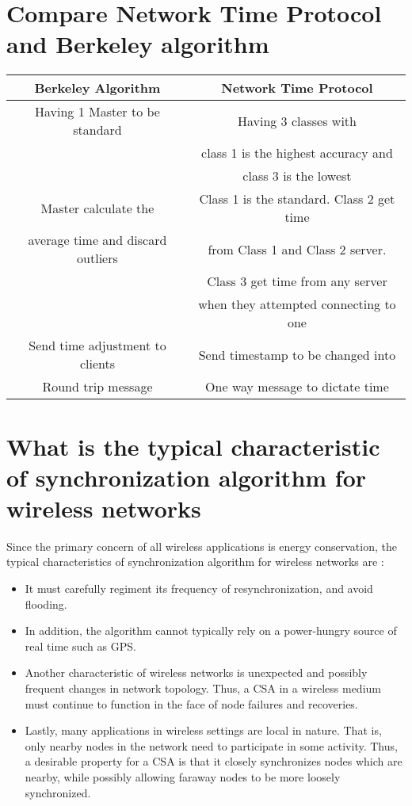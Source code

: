 \documentclass[11pt,a4paper]{article}
\begin{document}
\section{Compare Network Time Protocol and Berkeley algorithm}
\begin{tabular}{|c|c|}
\hline 
Berkeley Algorithm & Network Time Protocol \\ 
\hline 
Having 1 Master to be standard & Having 3 classes with \\ & class 1 is the highest accuracy and\\ & class 3 is the lowest \\ 
\hline 
Master calculate the & Class 1 is the standard. Class 2 get time \\ average time and discard outliers & from Class 1 and Class 2 server. \\ & Class 3 get time from any server \\ & when they attempted connecting to one \\ 
\hline 
Send time adjustment to clients  & Send timestamp to be changed into \\ 
\hline 
Round trip message & One way message to dictate time \\ 
\hline 
\end{tabular}

\section{What is the typical characteristic of synchronization algorithm for wireless networks}
Since the primary concern of all wireless applications is energy conservation, the typical characteristics of synchronization algorithm for wireless networks are :
\begin{itemize}
	\item It must carefully regiment its frequency of resynchronization, and avoid flooding. 
	\item In addition, the algorithm cannot typically rely on a power-hungry source of real time such as GPS. 
	\item Another characteristic of wireless networks is unexpected and possibly frequent changes in network topology. Thus, a CSA in a wireless medium must continue to function in the face of node failures and recoveries. 
	\item Lastly, many applications in wireless settings are local in nature. That is, only nearby nodes in the network need to participate in some activity. Thus, a desirable property for a CSA is that it closely synchronizes nodes which are nearby, while possibly allowing faraway nodes to be more loosely synchronized.
\end{itemize}
\end{document}
